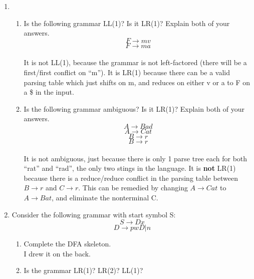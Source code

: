 
\usepackage{amsmath, verbatim, tikz, float, dsfont}

\oddsidemargin 0in
\evensidemargin 0in
\textwidth 6.5in
\topmargin -0.5in
\textheight 9.0in
\newcommand{\norm}[1]{\left\lVert #1 \right\rVert}
\newcommand{\?}{\stackrel{?}{=}}



\pagestyle{myheadings}


\begin{enumerate}
    \item
    \begin{enumerate}
        \item
        Is the following grammar LL(1)? Is it LR(1)? Explain both of your answers.
        $$F \rightarrow mv$$
        $$F \rightarrow ma$$\\

        It is not LL(1), because the grammar is not left-factored (there will be a first/first conflict on ``m''). It is LR(1) because there can be a valid parsing table which just shifts on m, and reduces on either v or a to F on a \$ in the input.

        \item
        Is the following grammar ambiguous? Is it LR(1)? Explain both of your answers.
        $$A \rightarrow Bad$$
        $$A \rightarrow Cat$$
        $$B \rightarrow r$$
        $$B \rightarrow r$$\\

        It is not ambiguous, just because there is only 1 parse tree each for both ``rat'' and ``rad'', the only two stings in the language. It is \textbf{not} LR(1) because there is a reduce/reduce conflict in the parsing table between $B \rightarrow r$ and $C \rightarrow r$. This can be remedied by changing $A \rightarrow Cat$ to $A \rightarrow Bat$, and eliminate the nonterminal C.
    \end{enumerate}

    \item Consider the following grammar with start symbol S:
    $$S \rightarrow Dx$$
    $$D \rightarrow pwD | n$$

    \begin{enumerate}
        \item Complete the DFA skeleton.\\

        I drew it on the back.\\
        \item Is the grammar LR(1)? LR(2)? LL(1)?\\


\end{enumerate}
\end{enumerate}
